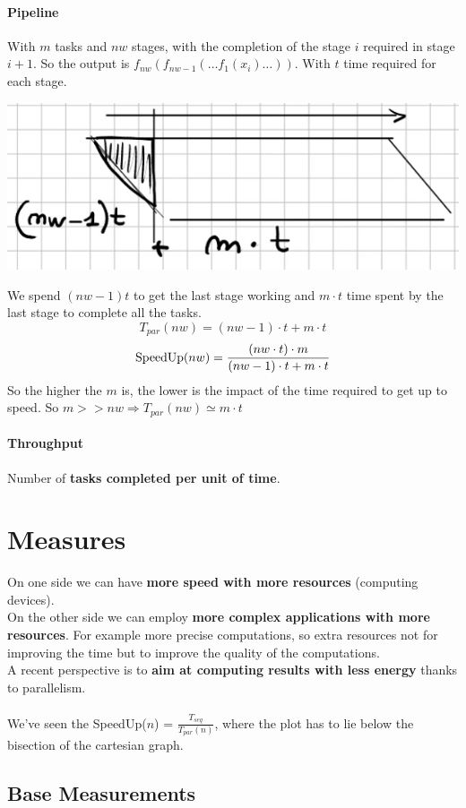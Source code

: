 \documentclass[10pt]{report}
\begin{document}
\paragraph{Pipeline} With $m$ tasks and $nw$ stages, with the completion of the stage $i$ required in stage $i+1$. So the output is $f_{nw}(f_{nw-1}(\ldots f_1(x_i)\ldots))$. With $t$ time required for each stage.
\begin{center}
	\includegraphics[scale=0.5]{2.png}
\end{center}
We spend $(nw-1)t$ to get the last stage working and $m\cdot t$ time spent by the last stage to complete all the tasks.
$$T_{par}(nw) = (nw-1)\cdot t + m\cdot t$$
$$\hbox{SpeedUp}(nw)=\frac{(nw\cdot t)\cdot m}{(nw-1)\cdot t + m\cdot t}$$
So the higher the $m$ is, the lower is the impact of the time required to get up to speed. So $m >> nw \Rightarrow T_{par}(nw) \simeq m\cdot t$
\paragraph{Throughput} Number of \textbf{tasks completed per unit of time}.
\section{Measures}
On one side we can have \textbf{more speed with more resources} (computing devices).\\
On the other side we can employ \textbf{more complex applications with more resources}. For example more precise computations, so extra resources not for improving the time but to improve the quality of the computations.\\
A recent perspective is to \textbf{aim at computing results with less energy} thanks to parallelism.\\\\
We've seen the SpeedUp($n$) = $\frac{T_{seq}}{T_{par}(n)}$, where the plot has to lie below the bisection of the cartesian graph.
\pagebreak
\subsection{Base Measurements}
\end{document}

